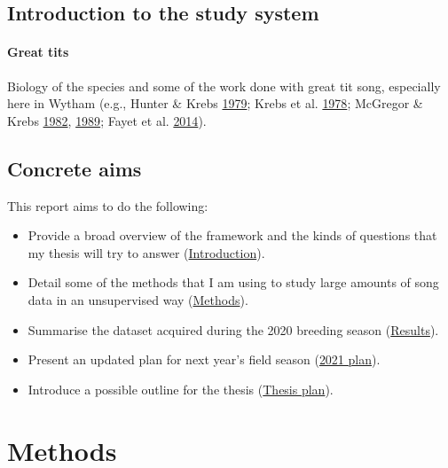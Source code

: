 \documentclass[]{report}
\begin{document}
\hypertarget{introduction-to-the-study-system}{%
\section{Introduction to the study
system}\label{introduction-to-the-study-system}}

\hypertarget{great-tits}{%
\subsubsection{Great tits}\label{great-tits}}

Biology of the species and some of the work done with great tit song,
especially here in Wytham (e.g., Hunter \& Krebs
\protect\hyperlink{ref-Hunter1979}{1979}; Krebs et al.
\protect\hyperlink{ref-Krebs1978}{1978}; McGregor \& Krebs
\protect\hyperlink{ref-McGregor1982}{1982},
\protect\hyperlink{ref-McGregor1989}{1989}; Fayet et al.
\protect\hyperlink{ref-Fayet2014}{2014}).

\hypertarget{concrete-aims}{%
\section{Concrete aims}\label{concrete-aims}}

This report aims to do the following:

\begin{itemize}
\item
  Provide a broad overview of the framework and the kinds of questions
  that my thesis will try to answer
  (\protect\hyperlink{introduction}{Introduction}).
\item
  Detail some of the methods that I am using to study large amounts of
  song data in an unsupervised way
  (\protect\hyperlink{Methods}{Methods}).
\item
  Summarise the dataset acquired during the 2020 breeding season
  (\protect\hyperlink{Results-and-discussion}{Results}).
\item
  Present an updated plan for next year's field season
  (\protect\hyperlink{Data-collection-plan-for-2021}{2021 plan}).
\item
  Introduce a possible outline for the thesis
  (\protect\hyperlink{Thesis-plan}{Thesis plan}).
\end{itemize}

\hypertarget{methods}{%
\chapter{Methods}\label{methods}}
\end{document}
